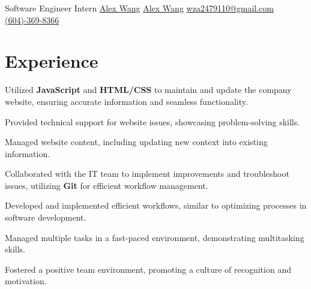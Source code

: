 \documentclass[]{plushcv}
\begin{document}
%
%

{\normalsize Software Engineer Intern}
{
{\href{https://github.com/wza2479110}{\normalsize Alex Wang}}
{\href{https://www.linkedin.com/in/alexzianwang/}{ \normalsize Alex Wang}}
{\href{mailto:wza2479110@gmail.com}{ \normalsize wza2479110@gmail.com}}
{\href{tel:+16043698366}{(604)-369-8366}}}

%
%

\begin{minipage}[t]{0.65 \textwidth} 



\section{Experience}
\vspace{\topsep} %
\begin{tightemize}
\sectionsep
\item Utilized \textbf{JavaScript} and \textbf{HTML/CSS} to maintain and update the company website, ensuring accurate information and seamless functionality.
\item Provided technical support for website issues, showcasing problem-solving skills.
\item Managed website content, including updating new context into existing information.
\item Collaborated with the IT team to implement improvements and troubleshoot issues, utilizing \textbf{Git} for efficient workflow management.
\end{tightemize}
\sectionsep

\begin{tightemize}
\sectionsep
\item Developed and implemented efficient workflows, similar to optimizing processes in software development.
\item Managed multiple tasks in a fast-paced environment, demonstrating multitasking skills.
\item Fostered a positive team environment, promoting a culture of recognition and motivation.
\end{tightemize}


\end{minipage}
\end{document}
